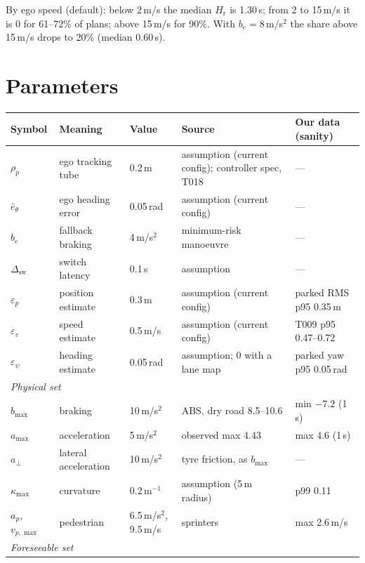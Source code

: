 \documentclass[11pt]{article}
\theoremstyle{definition}
\theoremstyle{remark}
\newcommand{\Hr}{H_{\mathrm{r}}}
\begin{document}
By ego speed (default): below 2\,m/s the median $\Hr$ is 1.30\,s; from 2 to 15\,m/s it is 0 for 61--72\% of
plans; above 15\,m/s for 90\%. With $b_e=8$\,m/s$^2$ the share above 15\,m/s drops to 20\% (median 0.60\,s).

\section{Parameters}\label{sec:params}

\begin{table}[h]
\centering
\small
\begin{tabular}{p{2.0cm}p{3.4cm}p{3.2cm}p{4.6cm}p{2.2cm}}
\toprule
Symbol & Meaning & Value & Source & Our data (sanity) \\
\midrule
$\rho_p$ & ego tracking tube & 0.2\,m & assumption (current config); controller spec, T018 & --- \\
$\bar e_\theta$ & ego heading error & 0.05\,rad & assumption (current config) & --- \\
$b_e$ & fallback braking & 4\,m/s$^2$ & minimum-risk manoeuvre \cite{unr157} & --- \\
$\Delta_{\mathrm{sw}}$ & switch latency & 0.1\,s & assumption & --- \\
\midrule
$\varepsilon_p$ & position estimate & 0.3\,m & assumption (current config) & parked RMS p95 0.35\,m \\
$\varepsilon_v$ & speed estimate & 0.5\,m/s & assumption (current config) & T009 p95 0.47--0.72 \\
$\varepsilon_\psi$ & heading estimate & 0.05\,rad & assumption; 0 with a lane map & parked yaw p95 0.05\,rad \\
\midrule
\multicolumn{5}{l}{\emph{Physical set}} \\
$b_{\max}$ & braking & 10\,m/s$^2$ & ABS, dry road 8.5--10.6 \cite{miller2023} & min $-7.2$ (1\,s) \\
$a_{\max}$ & acceleration & 5\,m/s$^2$ & observed max 4.43 \cite{bosetti2014} & max 4.6 (1\,s) \\
$a_\perp$ & lateral acceleration & 10\,m/s$^2$ & tyre friction, as $b_{\max}$ & --- \\
$\kappa_{\max}$ & curvature & 0.2\,m$^{-1}$ & assumption (5\,m radius) & p99 0.11 \\
$a_p$, $v_{p,\max}$ & pedestrian & 6.5\,m/s$^2$, 9.5\,m/s & sprinters \cite{diprampero2005} & max 2.6\,m/s \\
\midrule
\multicolumn{5}{l}{\emph{Foreseeable set}} \\

\end{tabular}
\end{table}
\end{document}
